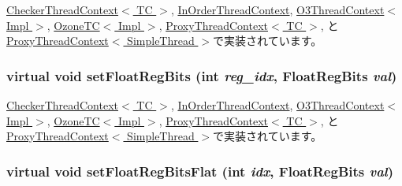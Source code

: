 \hyperlink{classCheckerThreadContext_ab6fd8e55b81c173f448ec0c42bc28b99}{CheckerThreadContext$<$ TC $>$}, \hyperlink{classInOrderThreadContext_ab6fd8e55b81c173f448ec0c42bc28b99}{InOrderThreadContext}, \hyperlink{classO3ThreadContext_a6da554ea484b758c095389b1373ffccc}{O3ThreadContext$<$ Impl $>$}, \hyperlink{classOzoneCPU_1_1OzoneTC_ab6fd8e55b81c173f448ec0c42bc28b99}{OzoneTC$<$ Impl $>$}, \hyperlink{classProxyThreadContext_ab6fd8e55b81c173f448ec0c42bc28b99}{ProxyThreadContext$<$ TC $>$}, と \hyperlink{classProxyThreadContext_ab6fd8e55b81c173f448ec0c42bc28b99}{ProxyThreadContext$<$ SimpleThread $>$}で実装されています。\hypertarget{classThreadContext_a8f0c8b07cd1c4a6019a5b3922689d1db}{
\subsubsection[{setFloatRegBits}]{\setlength{\rightskip}{0pt plus 5cm}virtual void setFloatRegBits (int {\em reg\_\-idx}, \/  {\bf FloatRegBits} {\em val})}}
\label{classThreadContext_a8f0c8b07cd1c4a6019a5b3922689d1db}


\hyperlink{classCheckerThreadContext_a618651078f08ecd328dfe3312f0f2ea7}{CheckerThreadContext$<$ TC $>$}, \hyperlink{classInOrderThreadContext_a618651078f08ecd328dfe3312f0f2ea7}{InOrderThreadContext}, \hyperlink{classO3ThreadContext_a2efe7073c68c7a9ab031aa829b5712a5}{O3ThreadContext$<$ Impl $>$}, \hyperlink{classOzoneCPU_1_1OzoneTC_a618651078f08ecd328dfe3312f0f2ea7}{OzoneTC$<$ Impl $>$}, \hyperlink{classProxyThreadContext_a618651078f08ecd328dfe3312f0f2ea7}{ProxyThreadContext$<$ TC $>$}, と \hyperlink{classProxyThreadContext_a618651078f08ecd328dfe3312f0f2ea7}{ProxyThreadContext$<$ SimpleThread $>$}で実装されています。\hypertarget{classThreadContext_a2964ca7e974bf80017ee30d832b32a35}{
\subsubsection[{setFloatRegBitsFlat}]{\setlength{\rightskip}{0pt plus 5cm}virtual void setFloatRegBitsFlat (int {\em idx}, \/  {\bf FloatRegBits} {\em val})}}
\label{classThreadContext_a2964ca7e974bf80017ee30d832b32a35}


